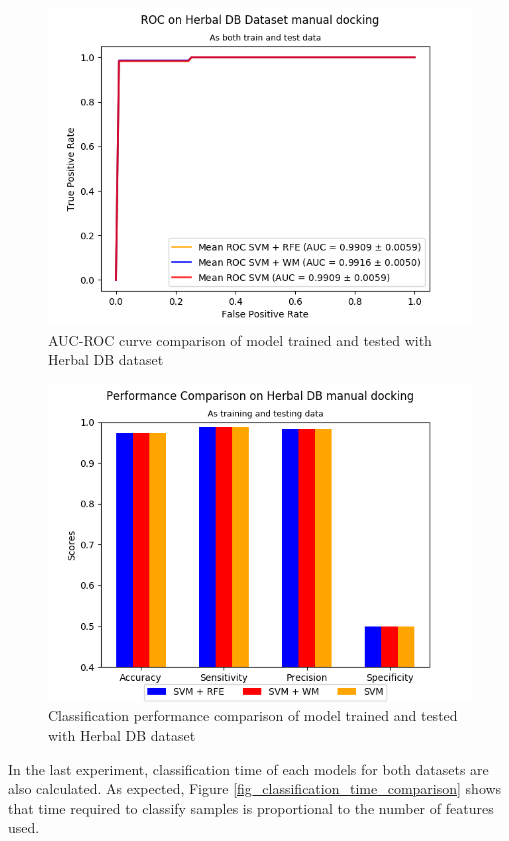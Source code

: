 \documentclass[conference,compsoc,12pt]{IEEEtran}
\begin{document}
	\begin{figure}
		\includegraphics[scale=0.5]{../images/03-evaluate-4_roc_chart.png}
		\caption{AUC-ROC curve comparison of model trained and tested with Herbal DB dataset}
		\label{fig_roc_comparison_herbaldb_only}
	\end{figure}
	
	\begin{figure}
		\includegraphics[scale=0.5]{../images/03-evaluate-4_scores_chart.png}
		\caption{Classification performance comparison of model trained and tested with Herbal DB dataset}
		\label{fig_performance_comparison_herbaldb_only}
	\end{figure}	
		
	In the last experiment, classification time of each models for both datasets are also calculated. As expected, Figure \ref{fig_classification_time_comparison} shows that time required to classify samples is proportional to the number of features used.
		
\end{document}
